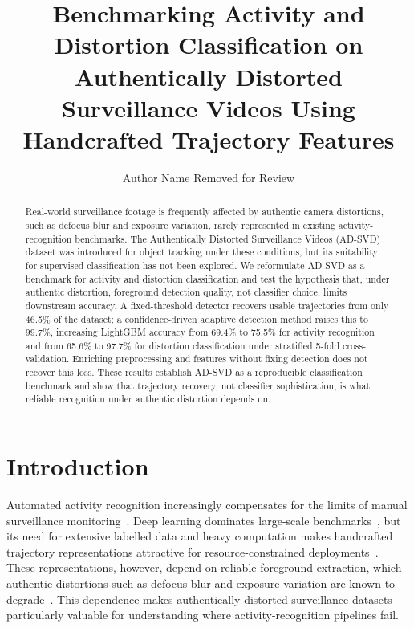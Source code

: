 \documentclass[runningheads]{llncs}
\begin{document}
\title{Benchmarking Activity and Distortion Classification on Authentically
Distorted Surveillance Videos Using Handcrafted Trajectory Features}


\author{Author Name Removed for Review}

\maketitle

\begin{abstract}
Real-world surveillance footage is frequently affected by authentic camera distortions, such as defocus blur and exposure variation, rarely represented in existing activity-recognition benchmarks. The Authentically Distorted Surveillance Videos (AD-SVD) dataset was introduced for object tracking under these conditions, but its suitability for supervised classification has not been explored. We reformulate AD-SVD as a benchmark for activity and distortion classification and test the hypothesis that, under authentic distortion, foreground detection quality, not classifier choice, limits downstream accuracy. A fixed-threshold detector recovers usable trajectories from only 46.5\% of the dataset; a confidence-driven adaptive detection method raises this to 99.7\%, increasing LightGBM accuracy from 69.4\% to 75.5\% for activity recognition and from 65.6\% to 97.7\% for distortion classification under stratified 5-fold cross-validation. Enriching preprocessing and features without fixing detection does not recover this loss. These results establish AD-SVD as a reproducible classification benchmark and show that trajectory recovery, not classifier sophistication, is what reliable recognition under authentic distortion depends on.

\end{abstract}

\section{Introduction}

Automated activity recognition increasingly compensates for the limits of manual surveillance monitoring~\cite{article}. Deep learning dominates large-scale benchmarks~\cite{ur2023use}, but its need for extensive labelled data and heavy computation makes handcrafted trajectory representations attractive for resource-constrained deployments~\cite{csurka2018handcrafted}. These representations, however, depend on reliable foreground extraction, which authentic distortions such as defocus blur and exposure variation are known to degrade~\cite{gillani2025distortion}. This dependence makes authentically distorted surveillance datasets particularly valuable for understanding where activity-recognition pipelines fail.
\end{document}
